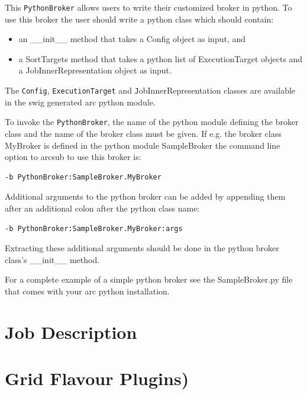\documentclass{book}
\newcommand{\Config}{\texttt{Config}}
\newcommand{\PythonBroker}{\texttt{PythonBroker}}
\newcommand{\ExecutionTarget}{\texttt{ExecutionTarget}}
\begin{document}
This {\PythonBroker} allows users to write their customized broker in
python. To use this broker the user should write a python class which 
should contain:

\begin{itemize}

\item{an \_\_init\_\_ method that takes a Config object as input, and}
\item{a SortTargets method that takes a python list of ExecutionTarget
  objects and a JobInnerRepresentation object as input.}

\end{itemize}

The {\Config}, {\ExecutionTarget} and {\texttt JobInnerRepresentation} classes are
available in the swig generated arc python module.

To invoke the {\PythonBroker}, the name of the python module defining
the broker class and the name of the broker class must be given. If
e.g. the broker class MyBroker is defined in the python module
SampleBroker the command line option to arcsub to use this broker is:

\begin{shaded}
\begin{verbatim}
-b PythonBroker:SampleBroker.MyBroker
\end{verbatim}
\end{shaded}

Additional arguments to the python broker can be added by appending
them after an additional colon after the python class name:

\begin{shaded}
\begin{verbatim}
-b PythonBroker:SampleBroker.MyBroker:args
\end{verbatim}
\end{shaded}

Extracting these additional arguments should be done in the python
broker class's \_\_init\_\_ method.

For a complete example of a simple python broker see the
SampleBroker.py file that comes with your arc python installation.

\chapter{Job Description}
\label{sec:jobdesc}

\chapter{Grid Flavour Plugins)}
\label{sec:plugins}
\end{document}
